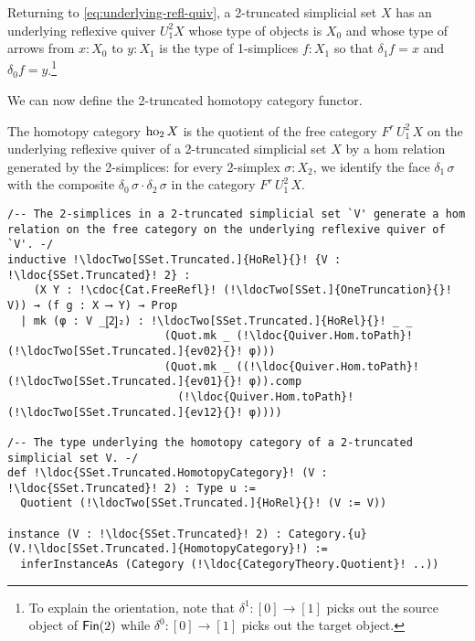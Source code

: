 \documentclass[a4paper,UKenglish,cleveref, autoref, thm-restate]{lipics-v2021}
\newcommand{\ho}{\textup{ho}}
\newcommand{\cat}[1]{\textup{\textsf{#1}}}%
\newcommand{\1}{\mathbbe{1}}
\newcommand{\2}{\mathbbe{2}}
\newcommand{\3}{\mathbbe{3}}
\newcommand{\Fin}{\cat{Fin}}
\newcommand{\ldoc}[2][]{\href{https://leanprover-community.github.io/mathlib4_docs/find/?pattern=#1#2\#doc}{\texttt{#2}}}
\newcommand{\cdoc}[2][]{\href{https://leanprover-community.github.io/mathlib4_docs/find/?pattern=CategoryTheory.#1#2\#doc}{\texttt{#2}}}
\newcommand{\ldocTwo}[3][]{\href{https://leanprover-community.github.io/mathlib4_docs/find/?pattern=#1#2\%E2\%82\%82#3\#doc}{\texttt{#2${}_2$#3}}}
\begin{document}
\begin{example}[{\ldocTwo[SSet.]{instReflQuiverOneTruncation}{}}]
  Returning to \eqref{eq:underlying-refl-quiv}, a 2-truncated simplicial set $X$ has an underlying reflexive quiver $U^2_1X$ whose type of objects is $X_0$ and whose type of arrows from $x : X_0$ to $y : X_1$ is the type of 1-simplices $f : X_1$ so that $\delta_1 f = x$ and $\delta_0 f = y$.\footnote{To explain the orientation, note that $\delta^1 \colon [0] \to [1]$ picks out the source object of $\Fin(2)$ while $\delta^0 \colon [0] \to [1]$ picks out the target object.}
\end{example}

We can now define the 2-truncated homotopy category functor.

\begin{definition}[{\ldoc[SSet.]{Truncated.HomotopyCategory}}]\label{defn:homotopy-category}
The homotopy category $\ho_2\,X$ is the quotient of the free category $F^r\, U^2_1\,X$ on the underlying reflexive quiver of a 2-truncated simplicial set $X$ by a hom relation generated by the 2-simplices: for every 2-simplex $\sigma : X_2$, we identify the face $\delta_1\, \sigma$ with the composite $\delta_0\,\sigma \cdot \delta_2\, \sigma$ in the category $F^r\,U^2_1\,X$.
\end{definition}
\begin{lstlisting}
/-- The 2-simplices in a 2-truncated simplicial set `V' generate a hom relation on the free category on the underlying reflexive quiver of `V'. -/
inductive !\ldocTwo[SSet.Truncated.]{HoRel}{}! {V : !\ldoc{SSet.Truncated}! 2} :
    (X Y : !\cdoc{Cat.FreeRefl}! (!\ldocTwo[SSet.]{OneTruncation}{}! V)) → (f g : X ⟶ Y) → Prop
  | mk (φ : V _⦋2⦌₂) : !\ldocTwo[SSet.Truncated.]{HoRel}{}! _ _
                        (Quot.mk _ (!\ldoc{Quiver.Hom.toPath}! (!\ldocTwo[SSet.Truncated.]{ev02}{}! φ)))
                        (Quot.mk _ ((!\ldoc{Quiver.Hom.toPath}! (!\ldocTwo[SSet.Truncated.]{ev01}{}! φ)).comp
                          (!\ldoc{Quiver.Hom.toPath}! (!\ldocTwo[SSet.Truncated.]{ev12}{}! φ))))

/-- The type underlying the homotopy category of a 2-truncated simplicial set V. -/
def !\ldoc{SSet.Truncated.HomotopyCategory}! (V : !\ldoc{SSet.Truncated}! 2) : Type u :=
  Quotient (!\ldocTwo[SSet.Truncated.]{HoRel}{}! (V := V))

instance (V : !\ldoc{SSet.Truncated}! 2) : Category.{u} (V.!\ldoc[SSet.Truncated.]{HomotopyCategory}!) :=
  inferInstanceAs (Category (!\ldoc{CategoryTheory.Quotient}! ..))
\end{lstlisting}
\end{document}

